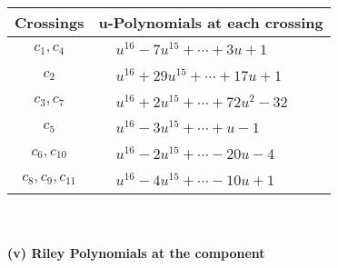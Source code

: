 \documentclass[1p]{elsarticle_modified}
\theoremstyle{definition}
\begin{document}
\begin{tabular}{m{50pt}|m{274pt}}
Crossings & \hspace{64pt}u-Polynomials at each crossing \\
\hline $$\begin{aligned}c_{1},c_{4}\end{aligned}$$&$\begin{aligned}
&u^{16}-7 u^{15}+\cdots+3 u+1
\end{aligned}$\\
\hline $$\begin{aligned}c_{2}\end{aligned}$$&$\begin{aligned}
&u^{16}+29 u^{15}+\cdots+17 u+1
\end{aligned}$\\
\hline $$\begin{aligned}c_{3},c_{7}\end{aligned}$$&$\begin{aligned}
&u^{16}+2 u^{15}+\cdots+72 u^2-32
\end{aligned}$\\
\hline $$\begin{aligned}c_{5}\end{aligned}$$&$\begin{aligned}
&u^{16}-3 u^{15}+\cdots+u-1
\end{aligned}$\\
\hline $$\begin{aligned}c_{6},c_{10}\end{aligned}$$&$\begin{aligned}
&u^{16}-2 u^{15}+\cdots-20 u-4
\end{aligned}$\\
\hline $$\begin{aligned}c_{8},c_{9},c_{11}\end{aligned}$$&$\begin{aligned}
&u^{16}-4 u^{15}+\cdots-10 u+1
\end{aligned}$\\
\hline
\end{tabular}\\~\\
\newpage\renewcommand{\arraystretch}{1}
\flushleft \textbf{(v) Riley Polynomials at the component}\newline \\
\end{document}

